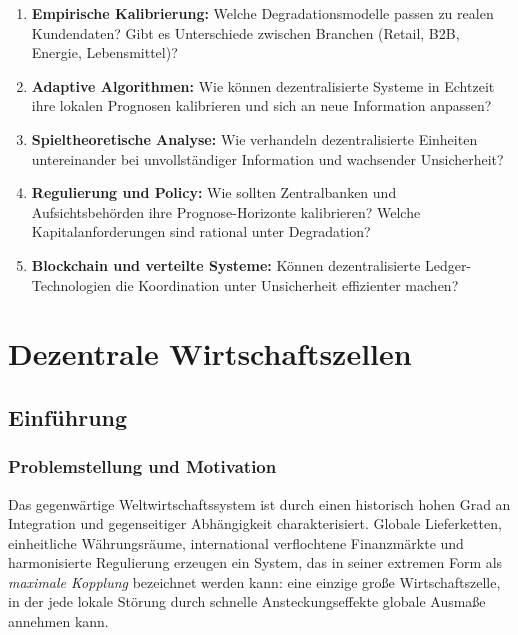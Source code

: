\documentclass[a4paper, 12pt, twoside, openright]{report}
\theoremstyle{definition}
\theoremstyle{definition}
\begin{document}
\begin{enumerate}
  \item \textbf{Empirische Kalibrierung:} Welche Degradationsmodelle passen zu realen Kundendaten? Gibt es Unterschiede zwischen Branchen (Retail, B2B, Energie, Lebensmittel)?
  
  \item \textbf{Adaptive Algorithmen:} Wie können dezentralisierte Systeme in Echtzeit ihre lokalen Prognosen kalibrieren und sich an neue Information anpassen?
  
  \item \textbf{Spieltheoretische Analyse:} Wie verhandeln dezentralisierte Einheiten untereinander bei unvollständiger Information und wachsender Unsicherheit?
  
  \item \textbf{Regulierung und Policy:} Wie sollten Zentralbanken und Aufsichtsbehörden ihre Prognose-Horizonte kalibrieren? Welche Kapitalanforderungen sind rational unter Degradation?
  
  \item \textbf{Blockchain und verteilte Systeme:} Können dezentralisierte Ledger-Technologien die Koordination unter Unsicherheit effizienter machen?
\end{enumerate}

\cleardoublepage

\chapter{Dezentrale Wirtschaftszellen}
\label{ch:decentralized-cells}

\section{Einführung}

\subsection{Problemstellung und Motivation}

Das gegenwärtige Weltwirtschaftssystem ist durch einen historisch hohen Grad an Integration und
gegenseitiger Abhängigkeit charakterisiert. Globale Lieferketten, einheitliche Währungsräume,
international verflochtene Finanzmärkte und harmonisierte Regulierung erzeugen ein System, das in
seiner extremen Form als \emph{maximale Kopplung} bezeichnet werden kann: eine einzige große
Wirtschaftszelle, in der jede lokale Störung durch schnelle Ansteckungseffekte globale Ausmaße
annehmen kann.
\end{document}
